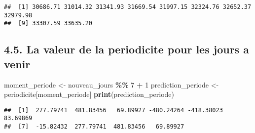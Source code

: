 \documentclass[
]{article}
\newenvironment{Shaded}{\begin{snugshade}}{\end{snugshade}}
\newcommand{\CommentTok}[1]{\textcolor[rgb]{0.56,0.35,0.01}{\textit{#1}}}
\newcommand{\DecValTok}[1]{\textcolor[rgb]{0.00,0.00,0.81}{#1}}
\newcommand{\FunctionTok}[1]{\textcolor[rgb]{0.13,0.29,0.53}{\textbf{#1}}}
\newcommand{\NormalTok}[1]{#1}
\newcommand{\OtherTok}[1]{\textcolor[rgb]{0.56,0.35,0.01}{#1}}
\newcommand{\SpecialCharTok}[1]{\textcolor[rgb]{0.81,0.36,0.00}{\textbf{#1}}}
\begin{document}
\begin{Shaded}
\end{Shaded}

\begin{verbatim}
##  [1] 30686.71 31014.32 31341.93 31669.54 31997.15 32324.76 32652.37 32979.98
##  [9] 33307.59 33635.20
\end{verbatim}

\subsection{4.5. La valeur de la periodicite pour les jours a
venir}\label{la-valeur-de-la-periodicite-pour-les-jours-a-venir}

\begin{Shaded}
\begin{Highlighting}[]
\NormalTok{moment\_periode }\OtherTok{\textless{}{-}}\NormalTok{ nouveau\_jours }\SpecialCharTok{\%\%} \DecValTok{7} \SpecialCharTok{+} \DecValTok{1} 
\NormalTok{prediction\_periode }\OtherTok{\textless{}{-}}\NormalTok{ periodicite[moment\_periode]}
\FunctionTok{print}\NormalTok{(prediction\_periode)}
\end{Highlighting}
\end{Shaded}

\begin{verbatim}
##  [1]  277.79741  481.83456   69.89927 -480.24264 -418.38023   83.69869
##  [7]  -15.82432  277.79741  481.83456   69.89927
\end{verbatim}
\end{document}
